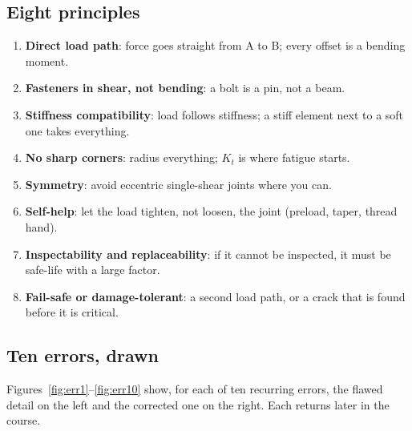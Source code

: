 \documentclass[11pt,a4paper]{article}
\begin{document}
\subsection{Eight principles}
\begin{enumerate}[nosep]
  \item \textbf{Direct load path}: force goes straight from A to B; every offset is a bending moment.
  \item \textbf{Fasteners in shear, not bending}: a bolt is a pin, not a beam.
  \item \textbf{Stiffness compatibility}: load follows stiffness; a stiff element next to a soft one takes everything.
  \item \textbf{No sharp corners}: radius everything; $K_t$ is where fatigue starts.
  \item \textbf{Symmetry}: avoid eccentric single-shear joints where you can.
  \item \textbf{Self-help}: let the load tighten, not loosen, the joint (preload, taper, thread hand).
  \item \textbf{Inspectability and replaceability}: if it cannot be inspected, it must be safe-life with a large factor.
  \item \textbf{Fail-safe or damage-tolerant}: a second load path, or a crack that is found before it is critical.
\end{enumerate}

\subsection{Ten errors, drawn}
Figures~\ref{fig:err1}--\ref{fig:err10} show, for each of ten recurring errors, the flawed detail on the left and the corrected one on the right. Each returns later in the course.
\end{document}
